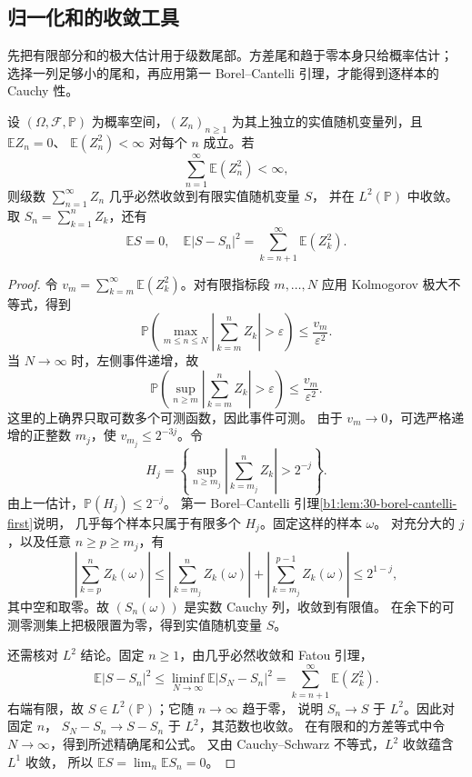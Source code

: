 \subsection{归一化和的收敛工具}
\label{b1:subsec:300503}

先把有限部分和的极大估计用于级数尾部。方差尾和趋于零本身只给概率估计；
选择一列足够小的尾和，再应用第一 Borel--Cantelli 引理，才能得到逐样本的 Cauchy 性。

\begin{theorem}[独立零均值级数的收敛]
\label{b1:thm:30-independent-series}
设 \((\Omega,\mathcal F,\mathbb P)\) 为概率空间，\((Z_n)_{n\geq1}\)
为其上独立的实值随机变量列，且 \(\mathbb E Z_n=0\)、
\(\mathbb E(Z_n^2)<\infty\) 对每个 \(n\) 成立。若
\[
 \sum_{n=1}^\infty\mathbb E(Z_n^2)<\infty,
\]
则级数 \(\sum_{n=1}^\infty Z_n\) 几乎必然收敛到有限实值随机变量 \(S\)，
并在 \(L^2(\mathbb P)\) 中收敛。取 \(S_n=\sum_{k=1}^nZ_k\)，还有
\[
 \mathbb E S=0,
 \quad
 \mathbb E|S-S_n|^2=\sum_{k=n+1}^\infty\mathbb E(Z_k^2).
\]
\end{theorem}
\begin{proof}
令 \(v_m=\sum_{k=m}^\infty\mathbb E(Z_k^2)\)。对有限指标段 \(m,\ldots,N\)
应用 Kolmogorov 极大不等式，得到
\[
 \mathbb P\left(\max_{m\leq n\leq N}
       \left|\sum_{k=m}^nZ_k\right|>\varepsilon\right)
 \leq\frac{v_m}{\varepsilon^2}.
\]
当 \(N\to\infty\) 时，左侧事件递增，故
\[
 \mathbb P\left(\sup_{n\geq m}
       \left|\sum_{k=m}^nZ_k\right|>\varepsilon\right)
 \leq\frac{v_m}{\varepsilon^2}.
\]
这里的上确界只取可数多个可测函数，因此事件可测。
由于 \(v_m\to0\)，可选严格递增的正整数 \(m_j\)，使
\(v_{m_j}\leq2^{-3j}\)。令
\[
 H_j=\left\{\sup_{n\geq m_j}
          \left|\sum_{k=m_j}^nZ_k\right|>2^{-j}\right\}.
\]
由上一估计，\(\mathbb P(H_j)\leq2^{-j}\)。
第一 Borel--Cantelli 引理\cref{b1:lem:30-borel-cantelli-first}说明，
几乎每个样本只属于有限多个 \(H_j\)。固定这样的样本 \(\omega\)。
对充分大的 \(j\)，以及任意 \(n\geq p\geq m_j\)，有
\[
 \left|\sum_{k=p}^nZ_k(\omega)\right|
 \leq\left|\sum_{k=m_j}^nZ_k(\omega)\right|
     +\left|\sum_{k=m_j}^{p-1}Z_k(\omega)\right|
 \leq2^{1-j},
\]
其中空和取零。故 \((S_n(\omega))\) 是实数 Cauchy 列，收敛到有限值。
在余下的可测零测集上把极限置为零，得到实值随机变量 \(S\)。

还需核对 \(L^2\) 结论。固定 \(n\geq1\)，由几乎必然收敛和 Fatou 引理，
\[
 \mathbb E|S-S_n|^2
 \leq\liminf_{N\to\infty}\mathbb E|S_N-S_n|^2
 =\sum_{k=n+1}^\infty\mathbb E(Z_k^2).
\]
右端有限，故 \(S\in L^2(\mathbb P)\)；它随 \(n\to\infty\) 趋于零，
说明 \(S_n\to S\) 于 \(L^2\)。因此对固定 \(n\)，
\(S_N-S_n\to S-S_n\) 于 \(L^2\)，其范数也收敛。
在有限和的方差等式中令 \(N\to\infty\)，得到所述精确尾和公式。
又由 Cauchy--Schwarz 不等式，\(L^2\) 收敛蕴含 \(L^1\) 收敛，
所以 \(\mathbb E S=\lim_n\mathbb E S_n=0\)。
\end{proof}

